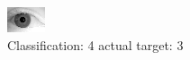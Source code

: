 \begin{figure}[h!]
\begin{center}
\includegraphics[width=0.60\columnwidth]{figures/ID2059_class_4_target_3.png}
\end{center}
\caption{ Classification: 4 actual target: 3}
\label{fig:ID2059_class_4_target_3}
\end{figure}
